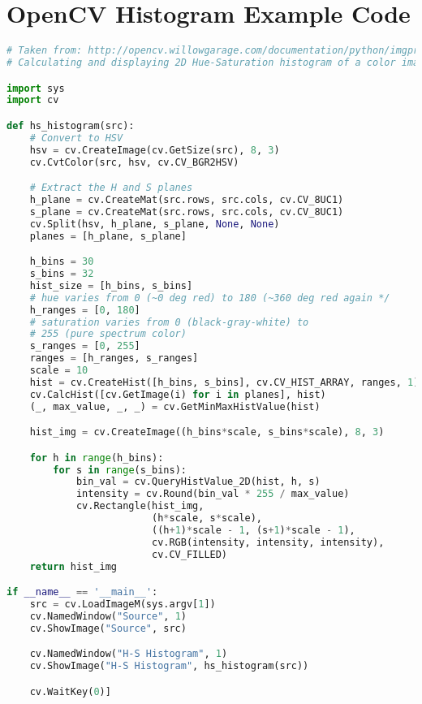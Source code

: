 \section{OpenCV Histogram Example Code}


\begin{lstlisting}[language=python,breaklines=true,label=lst:opencv_histogram,
caption={Example Histogram calculation and displaying code from OpenCV\cite{opencv_library}.}] 
# Taken from: http://opencv.willowgarage.com/documentation/python/imgproc_histograms.html#calchist
# Calculating and displaying 2D Hue-Saturation histogram of a color image

import sys
import cv

def hs_histogram(src):
    # Convert to HSV
    hsv = cv.CreateImage(cv.GetSize(src), 8, 3)
    cv.CvtColor(src, hsv, cv.CV_BGR2HSV)

    # Extract the H and S planes
    h_plane = cv.CreateMat(src.rows, src.cols, cv.CV_8UC1)
    s_plane = cv.CreateMat(src.rows, src.cols, cv.CV_8UC1)
    cv.Split(hsv, h_plane, s_plane, None, None)
    planes = [h_plane, s_plane]

    h_bins = 30
    s_bins = 32
    hist_size = [h_bins, s_bins]
    # hue varies from 0 (~0 deg red) to 180 (~360 deg red again */
    h_ranges = [0, 180]
    # saturation varies from 0 (black-gray-white) to
    # 255 (pure spectrum color)
    s_ranges = [0, 255]
    ranges = [h_ranges, s_ranges]
    scale = 10
    hist = cv.CreateHist([h_bins, s_bins], cv.CV_HIST_ARRAY, ranges, 1)
    cv.CalcHist([cv.GetImage(i) for i in planes], hist)
    (_, max_value, _, _) = cv.GetMinMaxHistValue(hist)

    hist_img = cv.CreateImage((h_bins*scale, s_bins*scale), 8, 3)

    for h in range(h_bins):
        for s in range(s_bins):
            bin_val = cv.QueryHistValue_2D(hist, h, s)
            intensity = cv.Round(bin_val * 255 / max_value)
            cv.Rectangle(hist_img,
                         (h*scale, s*scale),
                         ((h+1)*scale - 1, (s+1)*scale - 1),
                         cv.RGB(intensity, intensity, intensity), 
                         cv.CV_FILLED)
    return hist_img

if __name__ == '__main__':
    src = cv.LoadImageM(sys.argv[1])
    cv.NamedWindow("Source", 1)
    cv.ShowImage("Source", src)

    cv.NamedWindow("H-S Histogram", 1)
    cv.ShowImage("H-S Histogram", hs_histogram(src))

    cv.WaitKey(0)]
\end{lstlisting}



